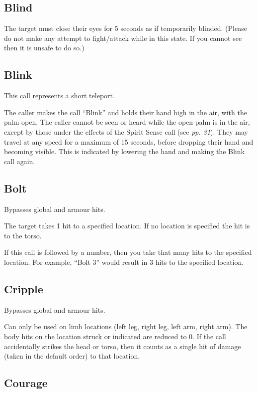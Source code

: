 \subsection{Blind}

The target must close their eyes for 5 seconds as if temporarily blinded. (Please do not make any attempt to fight/attack while in this state. If you cannot see then it is unsafe to do so.)

\subsection{Blink}

This call represents a short teleport.

The caller makes the call ``Blink'' and holds their hand high in the air, with the palm open. The caller cannot be seen or heard while the open palm is in the air, except by those under the effects of the Spirit Sense call (see \textit{pp. 31}). They may travel at any speed for a maximum of 15 seconds, before dropping their hand and becoming visible. This is indicated by lowering the hand and making the Blink call again.

\subsection{Bolt}

Bypasses global and armour hits.

The target takes 1 hit to a specified location. If no location is specified the hit is to the torso.

If this call is followed by a number, then you take that many hits to the specified location. For example, ``Bolt 3'' would result in 3 hits to the specified location.

\subsection{Cripple}

Bypasses global and armour hits.

Can only be used on limb locations (left leg, right leg, left arm, right arm). The body hits on the location struck or indicated are reduced to 0. If the call accidentally strikes the head or torso, then it counts as a single hit of damage (taken in the default order) to that location.

\subsection{Courage}


